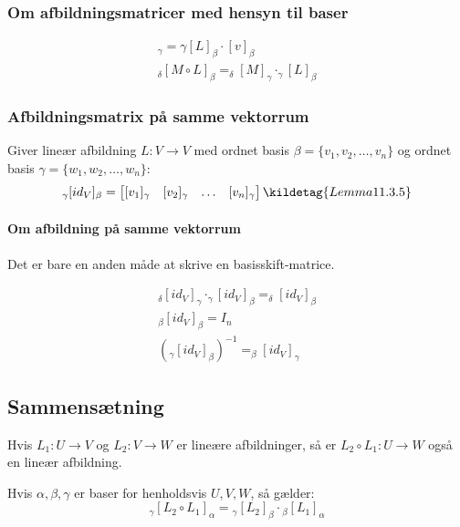 \subsubsection{Om afbildningsmatricer med hensyn til baser}

\begin{align*}
    [L(v)]_\gamma = \gamma [L]_\beta \cdot [v]_\beta \\
    _\delta [M \circ L]_\beta = _\delta [M]_\gamma \cdot _\gamma [L]_\beta
\end{align*}

\subsubsection{Afbildningsmatrix på samme vektorrum}
Giver lineær afbildning \( L : V \rightarrow V \) med ordnet basis \( \beta = \{ v_1, v_2, \ldots, v_n \} \) og ordnet basis \( \gamma = \{ w_1, w_2, \ldots, w_n \} \):
\[
_\gamma [id_V]_\beta = \begin{bmatrix}
    [v_1]_\gamma & [v_2]_\gamma & \ldots & [v_n]_\gamma
\end{bmatrix}
\kildetag{Lemma 11.3.5}
\]

\paragraph{Om afbildning på samme vektorrum}

Det er bare en anden måde at skrive en basisskift-matrice.

\begin{align*}
    _\delta [id_V]_\gamma \cdot _\gamma [id_V]_\beta = _\delta [id_V]_\beta \\
    _\beta [id_V]_\beta = I_n \\
    (_\gamma [id_V]_\beta)^{-1} = _\beta [id_V]_\gamma
\end{align*}

\subsection{Sammensætning}
Hvis \( L_1 : U \rightarrow V \) og \( L_2 : V \rightarrow W \) er lineære afbildninger, så er \( L_2 \circ L_1 : U \rightarrow W \) også en lineær afbildning. 


Hvis \( \alpha, \beta, \gamma \) er baser for henholdsvis \( U, V, W \), så gælder:
\[
_\gamma [L_2 \circ L_1]_\alpha 
= {_\gamma [L_2]_\beta} \cdot {_\beta [L_1]_\alpha}
\]

